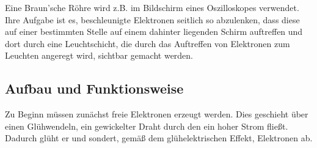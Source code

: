 




%
%	





Eine Braun'sche Röhre wird z.B. im Bildschirm eines Oszilloskopes verwendet. Ihre Aufgabe ist es, beschleunigte Elektronen seitlich so abzulenken, dass diese auf einer bestimmten Stelle auf einem dahinter liegenden Schirm auftreffen und dort durch eine Leuchtschicht, die durch das Auftreffen von Elektronen zum Leuchten angeregt wird, sichtbar gemacht werden.

\subsection{Aufbau und Funktionsweise}

Zu Beginn müssen zunächst freie Elektronen erzeugt werden. Dies geschieht über einen Glühwendeln, ein gewickelter Draht durch den ein hoher Strom fließt. Dadurch glüht er und sondert, gemäß dem glühelektrischen Effekt, Elektronen ab.

